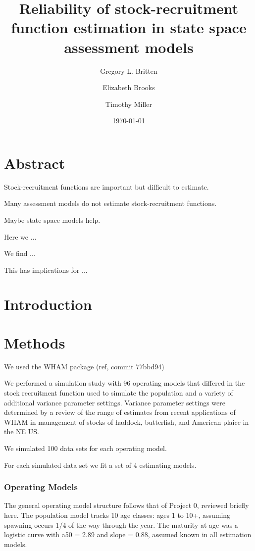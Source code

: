 \documentclass[11pt]{article}
\title{Reliability of stock-recruitment function estimation in state space assessment models}
\author[1]{Gregory L. Britten}
\author[2]{Elizabeth Brooks}
\author[2]{Timothy Miller}
\affil[1]{Woods Hole Oceanographic Institution}
\affil[2]{Northeast Fisheries Science Center}
\date{\small{\printdayoff\today}}
\begin{document}
\maketitle 
\linenumbers
\section*{Abstract}
Stock-recruitment functions are important but difficult to estimate.

Many assessment models do not estimate stock-recruitment functions.

Maybe state space models help.

Here we ...

We find ...

This has implications for ...
\section*{Introduction}

\section*{Methods}
We used the WHAM package (ref, commit 77bbd94)

We performed a simulation study with 96 operating models that differed in the stock recruitment function used to simulate the population and a variety of additional variance parameter settings. 
Variance parameter settings were determined by a review of the range of estimates from recent applications of WHAM in management of stocks of haddock, butterfish, and American plaice in the NE US.

We simulated 100 data sets for each operating model. 

For each simulated data set we fit a set of 4 estimating models.

\subsubsection*{Operating Models}
The general operating model structure follows that of Project 0, reviewed briefly here. 
The population model tracks 10 age classes: ages 1 to 10+, assuming spawning occurs
1/4 of the way through the year. 
The maturity at age was a logistic curve with a50 = 2.89 and slope = 0.88, assumed known in all estimation models.
\end{document}

